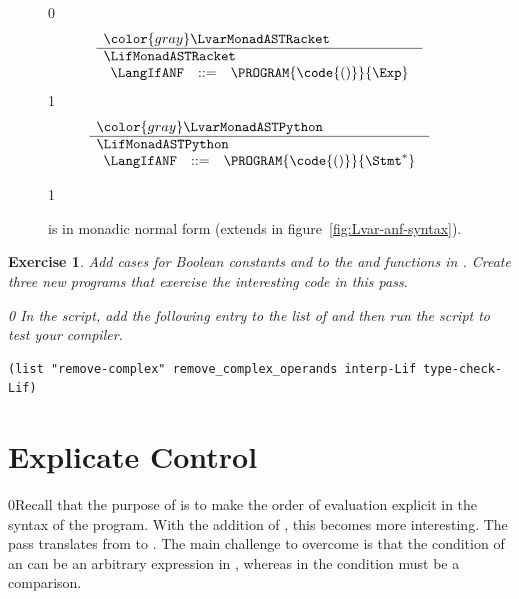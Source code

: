 \documentclass[7x10]{TimesAPriori_MIT}%
\newcommand{\gray}[1]{{\color{gray} #1}}
\def\racketEd{0}
\def\pythonEd{1}
\def\edition{0}
\newcommand{\racket}[1]{{\if\edition\racketEd{#1}\fi}}
\newcommand{\python}[1]{{\if\edition\pythonEd #1\fi}}
\newtheorem{exercise}[theorem]{Exercise}
\numberwithin{theorem}{chapter}
\numberwithin{definition}{chapter}
\numberwithin{equation}{chapter}
\begin{document}
\begin{figure}[tp]
\centering
\begin{tcolorbox}[colback=white]
{\if\edition\racketEd    
\[
\begin{array}{l}
  \gray{\LvarMonadASTRacket} \\ \hline
  \LifMonadASTRacket \\
\begin{array}{rcl}
\LangIfANF  &::=& \PROGRAM{\code{()}}{\Exp}
\end{array}
\end{array}
\]
\fi}
{\if\edition\pythonEd
\[
\begin{array}{l}
  \gray{\LvarMonadASTPython} \\ \hline
  \LifMonadASTPython \\
   \begin{array}{rcl}
     \LangIfANF  &::=& \PROGRAM{\code{()}}{\Stmt^{*}}
   \end{array}
\end{array}
\]
\fi}
\end{tcolorbox}
\python{}
\caption{\LangIfANF{} is \LangIf{} in monadic normal form
  (extends \LangVarANF in figure~\ref{fig:Lvar-anf-syntax}).}
\label{fig:Lif-anf-syntax}
\end{figure}


\begin{exercise}\normalfont\normalsize
%
Add cases for Boolean constants and  to the 
and  functions in .
%
Create three new \LangIf{} programs that exercise the interesting
code in this pass.
%
{\if\edition\racketEd    
In the  script, add the following entry to the
list of  and then run the script to test your compiler.
\begin{lstlisting}
(list "remove-complex" remove_complex_operands interp-Lif type-check-Lif)
\end{lstlisting}
\fi}
\end{exercise}


\section{Explicate Control}
\label{sec:explicate-control-Lif}

\racket{Recall that the purpose of  is to
  make the order of evaluation explicit in the syntax of the program.
  With the addition of \key{if}, this becomes more interesting.}
%
The  pass translates from \LangIf{} to \LangCIf{}.
%
The main challenge to overcome is that the condition of an 
can be an arbitrary expression in \LangIf{}, whereas in \LangCIf{} the
condition must be a comparison.
\end{document}
